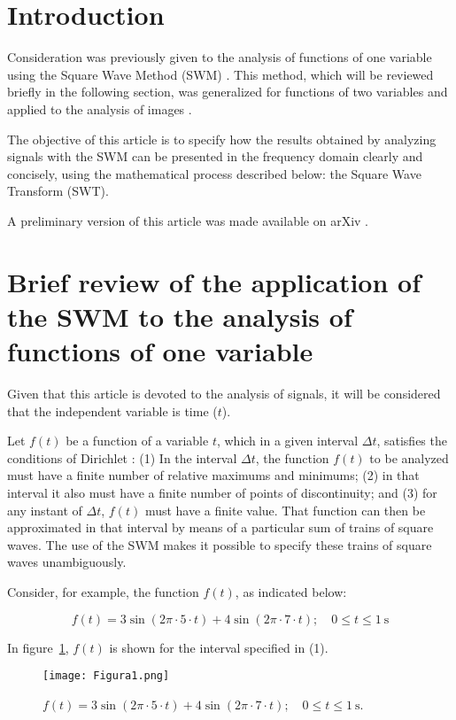 \documentclass[11pt]{rMTA2010} \usepackage[utf8]{inputenc} \usepackage{graphicx} \usepackage{booktabs} \usepackage{array} \usepackage{enumerate}
\begin{document}
\section{Introduction}

Consideration was previously given to the analysis of functions of one variable using the Square Wave Method (SWM) \cite{b1}. This method, which will be reviewed briefly in the following section, was generalized for functions of two variables and applied to the analysis of images \cite{b2}.

The objective of this article is to specify how the results obtained by analyzing signals with the SWM can be presented in the frequency domain clearly and concisely, using the mathematical process described below: the Square Wave Transform (SWT).

A preliminary version of this article was made available on arXiv \cite{b3a}.

\section{Brief review of the application of the SWM to the analysis of functions of one variable}

Given that this article is devoted to the analysis of signals, it will be considered that the independent variable is time ($t$).

Let $f(t)$ be a function of a variable $t$, which in a given interval $\Delta t$, satisfies the conditions of Dirichlet \cite{b3}: (1) In the interval $\Delta t$, the function $f(t)$ to be analyzed must have a finite number of relative maximums and minimums; (2) in that interval it also must have a finite number of points of discontinuity; and (3) for any instant of $\Delta t$, $f(t)$ must have a finite value. That function can then be approximated in that interval by means of a particular sum of trains of square waves. The use of the SWM makes it possible to specify these trains of square waves unambiguously.

Consider, for example, the function $f(t)$, as indicated below:

\begin{equation}
f(t)=3 \sin(2 \pi \cdot 5 \cdot t) + 4 \sin(2 \pi \cdot 7 \cdot t);\quad 0 \leq t \leq 1 \:\mathrm{s}
\end{equation}

In figure~\ref{f1}, $f(t)$ is shown for the interval specified in (1).
\begin{figure}[H]
\centering
\texttt{[image: Figura1.png]}
\caption{$f(t)=3 \sin(2 \pi \cdot 5 \cdot t) + 4 \sin(2 \pi \cdot 7 \cdot t);\quad 0 \leq t \leq 1 \:\mathrm{s}$.}
\label{f1}
\end{figure}
\end{document}
